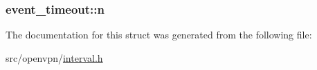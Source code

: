 \subsubsection[{n}]{ event\+\_\+timeout\+::n}\label{structevent__timeout_a65d28a125324b9550b025a3deacfc97a}


The documentation for this struct was generated from the following file\+:\begin{DoxyCompactItemize}
\item 
src/openvpn/\hyperlink{interval_8h}{interval.\+h}\end{DoxyCompactItemize}
